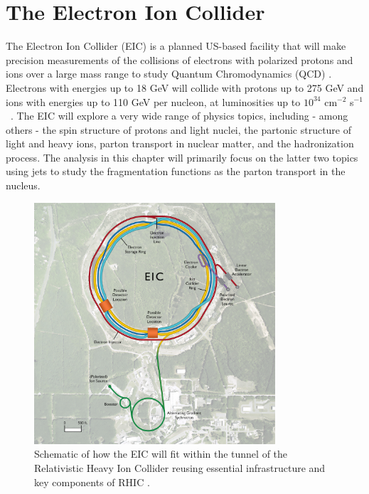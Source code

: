 




% 

\chapter{The Electron Ion Collider}
The Electron Ion Collider (EIC) is a planned US-based facility that will make precision measurements of the collisions of electrons with polarized protons 
and ions over a large mass range
%
to study Quantum Chromodynamics (QCD) \cite{Accardi:2012qut,Aschenauer:2017jsk}. Electrons with energies up to 18 GeV will collide with protons up to 275 GeV and ions with energies up to 110 GeV per nucleon, at luminosities up to $10^{34}$ cm$^{-2}$ s$^{-1}$~\cite{eRHIC:preCDR}. The EIC will explore a very wide range of physics topics, including - among others - the spin structure of protons and light nuclei, the partonic structure of light and heavy ions, parton transport in nuclear matter, and the hadronization process. The analysis in this chapter will primarily focus on the latter two topics using jets to study the fragmentation functions as the parton transport in the nucleus. 


\begin{figure}[htpb]
  \centering
  \includegraphics[width=0.8\textwidth]{EIC_Jets/eic.jpg}
  \caption{Schematic of how the EIC will fit within the tunnel of the Relativistic Heavy Ion Collider reusing essential infrastructure and key components of RHIC \cite{zotero-283}.}
  \label{fig:eic}
\end{figure}

